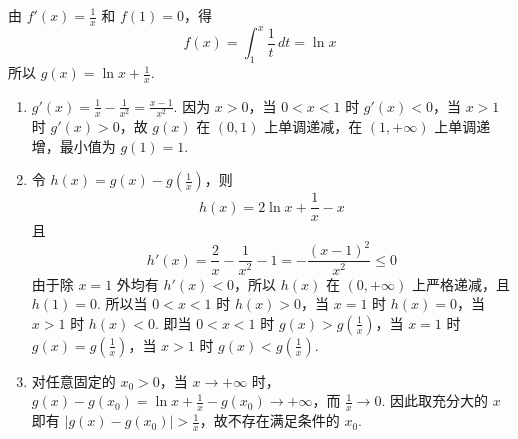 \begin{solution}
由 \(f'(x)=\frac{1}{x}\) 和 \(f(1)=0\)，得
\[
f(x)=\int_{1}^{x}\frac{1}{t}\,dt=\ln x
\]
所以 \(g(x)=\ln x+\frac{1}{x}\).

\begin{enumerate}
\item \(g'(x)=\frac{1}{x}-\frac{1}{x^{2}}=\frac{x-1}{x^{2}}\). 因为 \(x>0\)，当 \(0<x<1\) 时 \(g'(x)<0\)，当 \(x>1\) 时 \(g'(x)>0\)，故 \(g(x)\) 在 \((0,1)\) 上单调递减，在 \((1,+\infty)\) 上单调递增，最小值为 \(g(1)=1\).
\item 令 \(h(x)=g(x)-g\left(\frac{1}{x}\right)\)，则
\[
h(x)=2\ln x+\frac{1}{x}-x
\]
且
\[
h'(x)=\frac{2}{x}-\frac{1}{x^{2}}-1=-\frac{(x-1)^{2}}{x^{2}}\leqslant0
\]
由于除 \(x=1\) 外均有 \(h'(x)<0\)，所以 \(h(x)\) 在 \((0,+\infty)\) 上严格递减，且 \(h(1)=0\). 所以当 \(0<x<1\) 时 \(h(x)>0\)，当 \(x=1\) 时 \(h(x)=0\)，当 \(x>1\) 时 \(h(x)<0\). 即当 \(0<x<1\) 时 \(g(x)>g\left(\frac{1}{x}\right)\)，当 \(x=1\) 时 \(g(x)=g\left(\frac{1}{x}\right)\)，当 \(x>1\) 时 \(g(x)<g\left(\frac{1}{x}\right)\).
\item 对任意固定的 \(x_0>0\)，当 \(x\to+\infty\) 时，\(g(x)-g(x_0)=\ln x+\frac1x-g(x_0)\to+\infty\)，而 \(\frac1x\to0\). 因此取充分大的 \(x\) 即有 \(\lvert g(x)-g(x_0)\rvert>\frac1x\)，故不存在满足条件的 \(x_0\).
\end{enumerate}
\end{solution}
